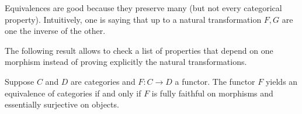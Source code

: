 Equivalences are good because they preserve many (but not every categorical property). Intuitively, one is saying that up to a natural transformation $F,G$ are one the inverse of the other. 

The following result allows to check a list of properties that depend on one morphism instead of proving explicitly the natural transformations.

\begin{theorem}[Maclane]
Suppose $C$ and $D$ are categories and $F : C \to D$ a functor. The functor $F$ yields an equivalence of categories if and only if $F$ is fully faithful on morphisms and essentially surjective on objects.
\end{theorem}




